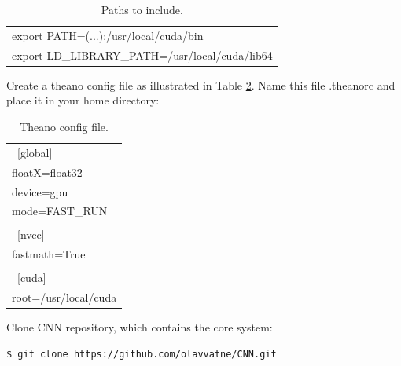 \FloatBarrier
\begin{table}[!htbp]
\caption[Paths to include]{Paths to include.}
\begin{center}
\begin{adjustbox}{max width=\textwidth}
\begin{tabular}{ l }
  \hline			
  export PATH=(...):/usr/local/cuda/bin  \\
  export LD\_LIBRARY\_PATH=/usr/local/cuda/lib64 \\
  \hline  
\end{tabular}
\end{adjustbox}
\end{center}
\label{tab:install_bash_paths}
\end{table}
\FloatBarrier

\noindent  Create a theano config file as illustrated in Table \ref{tab:install_theano_config_file}. Name this file .theanorc and place it in your home directory:\\

\FloatBarrier
\begin{table}[!htbp]
\caption[Theano config file]{Theano config file.}
\begin{center}
\begin{adjustbox}{max width=\textwidth}
\begin{tabular}{ l }
  \hline			
  ~[global] \\
  floatX=float32 \\
  device=gpu \\
  mode=FAST\_RUN \\
  \\
  ~[nvcc] \\
  fastmath=True \\
  \\
  ~[cuda] \\
  root=/usr/local/cuda \\
  \hline  
\end{tabular}
\end{adjustbox}
\end{center}
\label{tab:install_theano_config_file}
\end{table}
\FloatBarrier

\noindent Clone CNN repository, which contains the core system:
\begin{lstlisting}[language=bash]
  $ git clone https://github.com/olavvatne/CNN.git 
\end{lstlisting}
~\\


